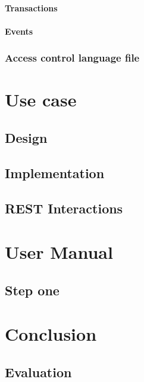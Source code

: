 \documentclass[a4paper,11pt]{report}
\begin{document}
\subsubsection{Transactions}
\subsubsection{Events}
\subsection{Access control language file}


\chapter{Use case}
\label{usecase}

\section{Design}
\section{Implementation}
\section{REST Interactions}

\chapter{User Manual}
\label{usermanual}


\section{Step one}
\label{stepOne}
	 


\chapter{Conclusion}

\label{conclusion}

\section{Evaluation}
\end{document}
